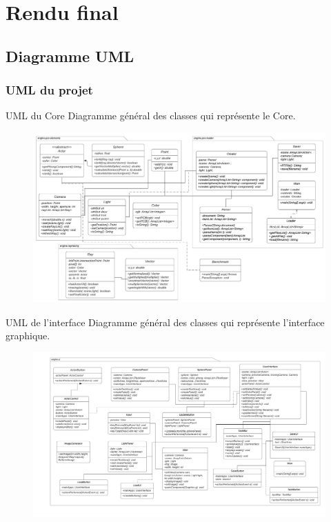 \documentclass{beamer}
\begin{document}
\section{Rendu final}
	\subsection{Diagramme UML}
		\begin{frame}
		\frametitle{UML du projet}
			\begin{block}{UML du Core}
			Diagramme général des classes qui représente le Core.
			\begin{figure}[h]
                    \begin{center}
                    \includegraphics[width=1\textwidth]{./images/Core.png}
                    \end{center}
                    \label{fig}
            \end{figure}
			\end{block}
		\end{frame}
		\begin{frame}
			\begin{block}{UML de l'interface}
			Diagramme général des classes qui représente l'interface graphique.
			\begin{figure}[h]
                    \begin{center}
                    \includegraphics[width=1\textwidth]{./images/Interface.png}
                    \end{center}
                    \label{fig}
            \end{figure}
			\end{block}
		\end{frame}
\end{document}
